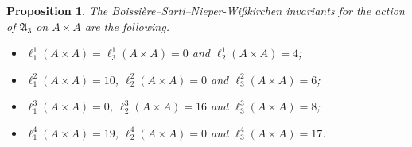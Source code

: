 \documentclass[a4paper]{article}
\newtheorem{prop}{Proposition}
\theoremstyle{remark}
\begin{document}
\begin{prop}\label{AA}
The Boissi\`ere--Sarti--Nieper-Wi\ss kirchen invariants for the action of $\mathfrak{A}_3$ on $A\times A$ are the following.
\begin{itemize}
\item[(i)]
$\ell_1^1(A\times A)=\ell_3^1(A\times A)=0$ and $\ell_2^1(A\times A)=4$;
\item[(ii)]
$\ell_1^2(A\times A)=10$, $\ell_2^2(A\times A)=0$ and  $\ell_3^2(A\times A)=6$;
\item[(iii)]
$\ell_1^3(A\times A)=0$, $\ell_2^3(A\times A)=16$ and  $\ell_3^3(A\times A)=8$;
\item[(iv)]
$\ell_1^4(A\times A)=19$, $\ell_2^4(A\times A)=0$ and  $\ell_3^4(A\times A)=17$.
\end{itemize}
\end{prop}
\end{document}
